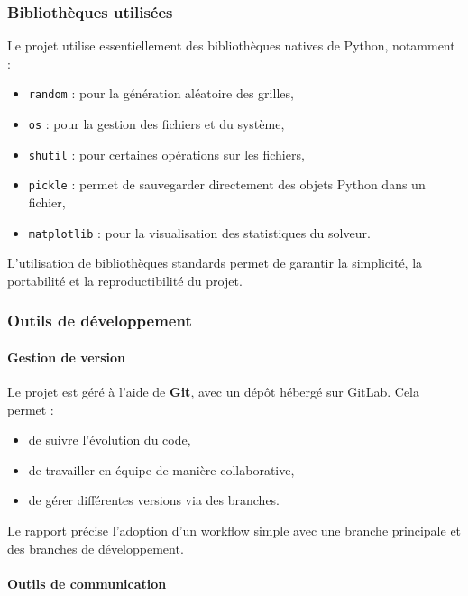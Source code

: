 \documentclass[a4paper]{article}
\begin{document}
\subsubsection{Bibliothèques utilisées}

Le projet utilise essentiellement des bibliothèques natives de Python, notamment :
\begin{itemize}
    \item \texttt{random} : pour la génération aléatoire des grilles,
    \item \texttt{os} : pour la gestion des fichiers et du système,
    \item \texttt{shutil} : pour certaines opérations sur les fichiers,
    \item \texttt{pickle} : permet de sauvegarder directement des objets Python dans un fichier,
    \item \texttt{matplotlib} : pour la visualisation des statistiques du solveur.
\end{itemize}

L’utilisation de bibliothèques standards permet de garantir la simplicité, la portabilité et la reproductibilité du projet.

\subsubsection{Outils de développement}

\paragraph{Gestion de version}

Le projet est géré à l’aide de \textbf{Git}, avec un dépôt hébergé sur GitLab. Cela permet :
\begin{itemize}
    \item de suivre l’évolution du code,
    \item de travailler en équipe de manière collaborative,
    \item de gérer différentes versions via des branches.
\end{itemize}

Le rapport précise l’adoption d’un workflow simple avec une branche principale et des branches de développement.

\paragraph{Outils de communication}
\end{document}
